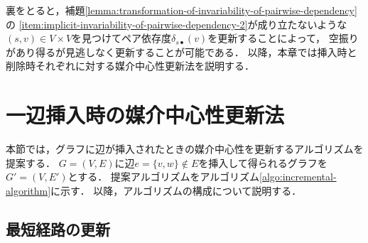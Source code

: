 裏をとると，補題\ref{lemma:transformation-of-invariability-of-pairwise-dependency}の
\ref{item:implicit-invariability-of-pairwise-dependency-2}が成り立たないような
$(s,v)\in V\times V$を見つけてペア依存度$\delta_{s\bullet}(v)$を更新することによって，
空振りがあり得るが見逃しなく更新することが可能である．
以降，本章では挿入時と削除時それぞれに対する媒介中心性更新法を説明する．

\section{一辺挿入時の媒介中心性更新法}
\label{sect:update-bc-on-insert}
本節では，グラフに辺が挿入されたときの媒介中心性を更新するアルゴリズムを提案する．
$G=(V,E)$に辺$e=\{v,w\} \not\in E$を挿入して得られるグラフを$G'=(V,E')$とする．
提案アルゴリズムをアルゴリズム\ref{algo:incremental-algorithm}に示す．
以降，アルゴリズムの構成について説明する．

\subsection{最短経路の更新}
\label{subsect:update-augdist-on-insert}

